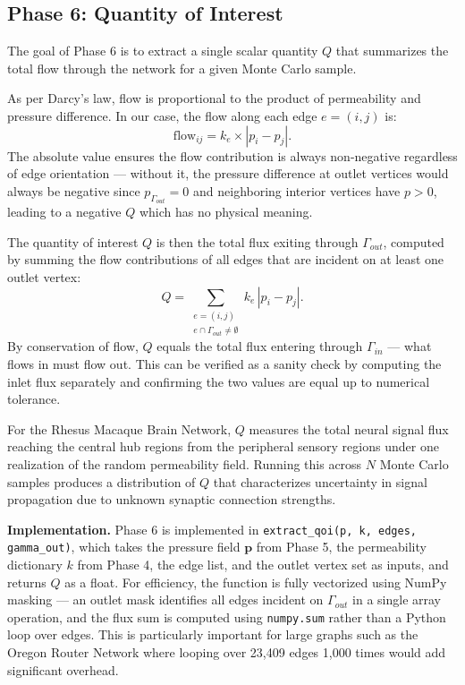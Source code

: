 \documentclass[a4paper,12pt]{amsart}
\numberwithin{equation}{section}
\def\bp{{\mathbf p}}
\begin{document}
\subsection{Phase 6: Quantity of Interest}
\label{sec:qoi_normalization}

The goal of Phase 6 is to extract a single scalar quantity $Q$ that 
summarizes the total flow through the network for a given Monte Carlo 
sample.

As per Darcy's law, flow is proportional to the product of permeability 
and pressure difference. In our case, the flow along each edge 
$e = (i,j)$ is:
\begin{equation}
\text{flow}_{ij} = k_e \times |p_i - p_j|.
\end{equation}
The absolute value ensures the flow contribution is always non-negative 
regardless of edge orientation — without it, the pressure difference at 
outlet vertices would always be negative since $p_{\Gamma_{out}} = 0$ 
and neighboring interior vertices have $p > 0$, leading to a negative 
$Q$ which has no physical meaning.

The quantity of interest $Q$ is then the total flux exiting through 
$\Gamma_{out}$, computed by summing the flow contributions of all edges 
that are incident on at least one outlet vertex:
\begin{equation}
Q = \sum_{\substack{e=(i,j) \\ e \cap \Gamma_{out} \neq \emptyset}} 
k_e \, |p_i - p_j|.
\end{equation}
By conservation of flow, $Q$ equals the total flux entering through 
$\Gamma_{in}$ — what flows in must flow out. This can be verified as 
a sanity check by computing the inlet flux separately and confirming 
the two values are equal up to numerical tolerance.

For the Rhesus Macaque Brain Network, $Q$ measures the total neural 
signal flux reaching the central hub regions from the peripheral 
sensory regions under one realization of the random permeability field. 
Running this across $N$ Monte Carlo samples produces a distribution of 
$Q$ that characterizes uncertainty in signal propagation due to unknown 
synaptic connection strengths.

\textbf{Implementation.} Phase 6 is implemented in 
\texttt{extract\_qoi(p, k, edges, gamma\_out)}, which takes the pressure 
field $\bp$ from Phase 5, the permeability dictionary $k$ from Phase 4, 
the edge list, and the outlet vertex set as inputs, and returns $Q$ as 
a float. For efficiency, the function is fully vectorized using NumPy 
masking — an outlet mask identifies all edges incident on $\Gamma_{out}$ 
in a single array operation, and the flux sum is computed using 
\texttt{numpy.sum} rather than a Python loop over edges. This is 
particularly important for large graphs such as the Oregon Router Network 
where looping over 23,409 edges 1,000 times would add significant 
overhead.
\end{document}
